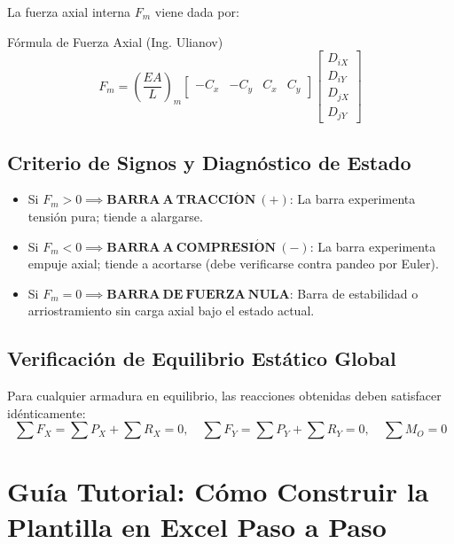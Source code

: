 \documentclass[11pt,a4paper]{article}
\begin{document}
La fuerza axial interna $F_m$ viene dada por:
\begin{formulabox}{Fórmula de Fuerza Axial (Ing. Ulianov)}
\begin{equation}
    F_m = \left(\frac{EA}{L}\right)_m \begin{bmatrix} -C_x & -C_y & C_x & C_y \end{bmatrix} \begin{bmatrix} D_{iX} \\ D_{iY} \\ D_{jX} \\ D_{jY} \end{bmatrix}
\end{equation}
\end{formulabox}

\subsection{Criterio de Signos y Diagnóstico de Estado}
\begin{itemize}
    \item Si $F_m > 0 \implies \mathbf{BARRA\ A\ TRACCI\acute{O}N\ (+)}$: La barra experimenta tensión pura; tiende a alargarse.
    \item Si $F_m < 0 \implies \mathbf{BARRA\ A\ COMPRESI\acute{O}N\ (-)}$: La barra experimenta empuje axial; tiende a acortarse (debe verificarse contra pandeo por Euler).
    \item Si $F_m = 0 \implies \mathbf{BARRA\ DE\ FUERZA\ NULA}$: Barra de estabilidad o arriostramiento sin carga axial bajo el estado actual.
\end{itemize}

\subsection{Verificación de Equilibrio Estático Global}
Para cualquier armadura en equilibrio, las reacciones obtenidas deben satisfacer idénticamente:
\begin{equation}
    \sum F_X = \sum P_X + \sum R_X = 0, \quad \sum F_Y = \sum P_Y + \sum R_Y = 0, \quad \sum M_O = 0
\end{equation}

\section{Guía Tutorial: Cómo Construir la Plantilla en Excel Paso a Paso}
\end{document}
